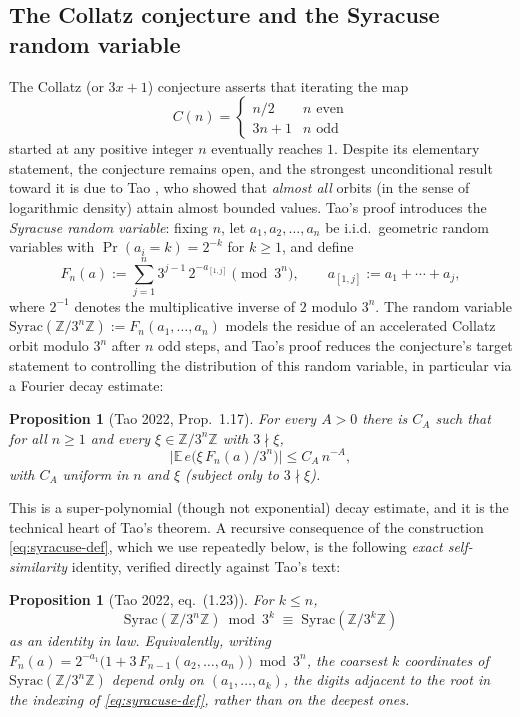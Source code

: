 \documentclass[11pt]{article}
\newtheorem{proposition}[theorem]{Proposition}
\theoremstyle{definition}
\theoremstyle{remark}
\begin{document}
\subsection{The Collatz conjecture and the Syracuse random variable}

The Collatz (or $3x+1$) conjecture asserts that iterating the map
\[
  C(n) = \begin{cases} n/2 & n \text{ even} \\ 3n+1 & n \text{ odd} \end{cases}
\]
started at any positive integer $n$ eventually reaches $1$. Despite its
elementary statement, the conjecture remains open, and the strongest
unconditional result toward it is due to Tao \cite{Tao2022}, who showed
that \emph{almost all} orbits (in the sense of logarithmic density)
attain almost bounded values. Tao's proof introduces the
\emph{Syracuse random variable}: fixing $n$, let $a_1,a_2,\dots,a_n$ be
i.i.d.\ geometric random variables with $\Pr(a_i=k)=2^{-k}$ for
$k\ge 1$, and define
\begin{equation}\label{eq:syracuse-def}
  F_n(a) := \sum_{j=1}^n 3^{j-1}\, 2^{-a_{[1,j]}} \pmod{3^n}, \qquad
  a_{[1,j]} := a_1+\cdots+a_j,
\end{equation}
where $2^{-1}$ denotes the multiplicative inverse of $2$ modulo $3^n$.
The random variable $\mathrm{Syrac}(\mathbb{Z}/3^n\mathbb{Z}) :=
F_n(a_1,\dots,a_n)$ models the residue of an accelerated Collatz orbit
modulo $3^n$ after $n$ odd steps, and Tao's
proof reduces the conjecture's target statement to controlling the
distribution of this random variable, in particular via a Fourier
decay estimate:

\begin{proposition}[Tao 2022, Prop.~1.17]\label{prop:tao117}
For every $A>0$ there is $C_A$ such that for all $n\ge 1$ and every
$\xi\in\mathbb{Z}/3^n\mathbb{Z}$ with $3\nmid \xi$,
\[
  \bigl|\mathbb{E}\, e\bigl(\xi\, F_n(a)/3^n\bigr)\bigr| \le C_A\, n^{-A},
\]
with $C_A$ uniform in $n$ and $\xi$ (subject only to $3\nmid\xi$).
\end{proposition}

This is a super-polynomial (though not exponential) decay estimate,
and it is the technical heart of Tao's theorem. A recursive
consequence of the construction \eqref{eq:syracuse-def}, which we use
repeatedly below, is the following \emph{exact self-similarity}
identity, verified directly against Tao's text:

\begin{proposition}[Tao 2022, eq.~(1.23)]\label{prop:tao123}
For $k\le n$,
\[
  \mathrm{Syrac}(\mathbb{Z}/3^n\mathbb{Z}) \bmod 3^k \; \equiv\;
  \mathrm{Syrac}(\mathbb{Z}/3^k\mathbb{Z})
\]
as an identity in law. Equivalently, writing $F_n(a) =
2^{-a_1}\bigl(1+3\,F_{n-1}(a_2,\dots,a_n)\bigr) \bmod 3^n$, the
coarsest $k$ coordinates of $\mathrm{Syrac}(\mathbb{Z}/3^n\mathbb{Z})$
depend only on $(a_1,\dots,a_k)$, the digits \emph{adjacent to the
root} in the indexing of \eqref{eq:syracuse-def}, rather than on the
deepest ones.
\end{proposition}
\end{document}
